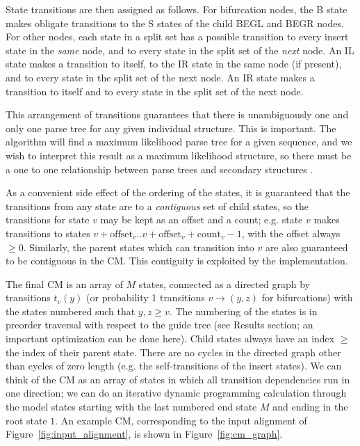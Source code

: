 \documentclass[11pt]{article}
\begin{document}
State transitions are then assigned as follows. For bifurcation nodes,
the B state makes obligate transitions to the S states of the child
BEGL and BEGR nodes. For other nodes, each state in a split set has a
possible transition to every insert state in the \emph{same} node, and
to every state in the split set of the \emph{next} node. An IL state
makes a transition to itself, to the IR state in the same node (if
present), and to every state in the split set of the next node. An IR
state makes a transition to itself and to every state in the split set
of the next node.

This arrangement of transitions guarantees that there is unambiguously
one and only one parse tree for any given individual structure. This
is important. The algorithm will find a maximum likelihood parse tree
for a given sequence, and we wish to interpret this result as a
maximum likelihood structure, so there must be a one to one
relationship between parse trees and secondary structures
\cite{Giegerich00}.

As a convenient side effect of the ordering of the states, it is
guaranteed that the transitions from any state are to a
\emph{contiguous} set of child states, so the transitions for state
$v$ may be kept as an offset and a count; e.g. state $v$ makes
transitions to states
$v+\mbox{offset}_v..v+\mbox{offset}_v+\mbox{count}_v-1$, with the
offset always $\geq 0$.  Similarly, the parent states which can
transition into $v$ are also guaranteed to be contiguous in the
CM. This contiguity is exploited by the implementation.

The final CM is an array of $M$ states, connected as a directed graph
by transitions $t_v(y)$ (or probability 1 transitions $v \rightarrow
(y,z)$ for bifurcations) with the states numbered such that $y,z \geq
v$. The numbering of the states is in preorder traversal with respect
to the guide tree (see Results section; an important optimization can
be done here). Child states always have an index $\geq$ the index of
their parent state.  There are no cycles in the directed graph other
than cycles of zero length (e.g. the self-transitions of the insert
states). We can think of the CM as an array of states in which all
transition dependencies run in one direction; we can do an iterative
dynamic programming calculation through the model states starting with
the last numbered end state $M$ and ending in the root state $1$.  An
example CM, corresponding to the input alignment of
Figure~\ref{fig:input_alignment}, is shown in
Figure~\ref{fig:cm_graph}.
\end{document}
